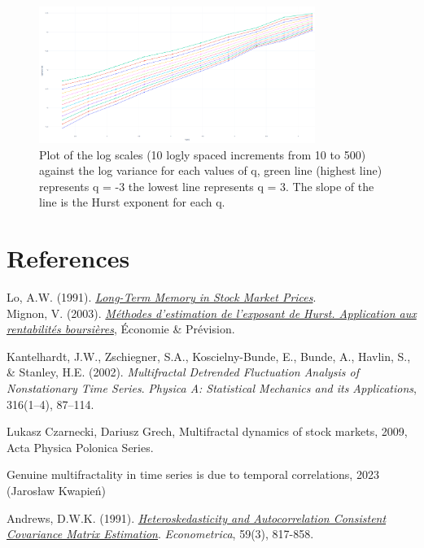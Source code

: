 \documentclass[11pt]{extarticle}
\begin{document}
\begin{figure}[ht]
    \centering
    \includegraphics[width=0.8\textwidth]{img/log_variance_log_scale}
    \caption{Plot of the log scales (10 logly spaced increments from 10 to 500) against the log variance for each values of q, green line (highest line) represents q = -3
    the lowest line represents q = 3. The slope of the line is the Hurst exponent for each q.}
    \label{fig:log_variance_log_scale}
\end{figure}
\FloatBarrier



\section{References}

Lo, A.W. (1991). \textit{\href{http://www.e-m-h.org/Lo\_\_91.pdf}{Long-Term Memory in Stock Market Prices}}. \\

Mignon, V. (2003). \textit{\href{https://www.persee.fr/doc/ecop_0249-4744_1998_num_132_1_5909}{Méthodes d'estimation de l'exposant de Hurst. Application aux rentabilités boursières}}, Économie \& Prévision.

Kantelhardt, J.W., Zschiegner, S.A., Koscielny-Bunde, E., Bunde, A., Havlin, S., \& Stanley, H.E. (2002). \textit{Multifractal Detrended Fluctuation Analysis of Nonstationary Time Series}. \textit{Physica A: Statistical Mechanics and its Applications}, 316(1--4), 87--114.

Lukasz Czarnecki, Dariusz Grech, Multifractal dynamics of stock markets, 2009, Acta Physica Polonica Series.

Genuine multifractality in time series is due to temporal correlations, 2023 (Jarosław Kwapień)

Andrews, D.W.K. (1991). \textit{\href{https://www.jstor.org/stable/2938229}{Heteroskedasticity and Autocorrelation Consistent Covariance Matrix Estimation}}. \textit{Econometrica}, 59(3), 817-858.
\end{document}
